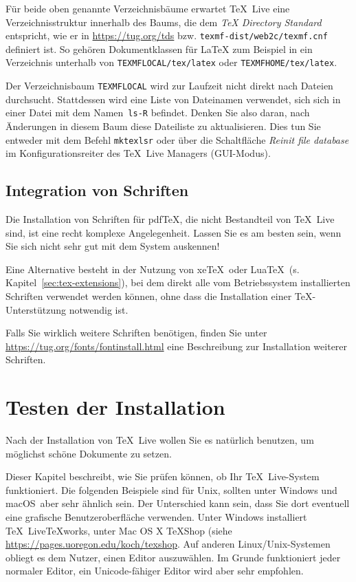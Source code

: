\documentclass[12pt,ngerman,a4paper,fullparskip]{scrreprt}
\newcommand{\TL}{\TeX\ Live\xspace}
\newcommand{\cmdname}[1]{\texttt{#1}}
\newcommand{\filename}[1]{\texttt{#1}}
\newcommand{\dirname}[1]{\texttt{#1}}
\providecommand*{\macOS}{macOS\xspace}
\providecommand*{\XeTeX}{xe\TeX\xspace}
\begin{document}
Für beide oben genannte Verzeichnisbäume erwartet \TL eine Verzeichnisstruktur innerhalb des Baums, die dem \emph{\TeX{} Directory Standard} entspricht, wie er in \url{https://tug.org/tds} bzw. \filename{texmf-dist/web2c/texmf.cnf} definiert ist.
So gehören Dokumentklassen für \LaTeX{} zum Beispiel in ein Verzeichnis
unterhalb von \dirname{TEXMFLOCAL/tex/latex} oder \dirname{TEXMFHOME/tex/latex}.

Der Verzeichnisbaum \dirname{TEXMFLOCAL} wird zur Laufzeit nicht direkt nach Dateien durchsucht. Stattdessen wird eine Liste von Dateinamen verwendet, sich sich in einer Datei mit dem Namen~\filename{ls-R} befindet. Denken Sie also daran, nach Änderungen in diesem Baum diese Dateiliste zu aktualisieren. Dies tun Sie
entweder mit dem Befehl \cmdname{mktexlsr} oder über die Schaltfläche \emph{Reinit file database} im Kon\-fi\-gu\-rations\-reiter des \TeX\ Live Managers (GUI-Modus).

\subsection{Integration von Schriften}

Die Installation von Schriften für pdf\TeX, die nicht Bestandteil von \TL sind, ist eine recht komplexe Angelegenheit. Lassen Sie es am besten sein, wenn Sie sich nicht sehr gut mit dem System auskennen! %

Eine Alternative besteht in der Nutzung von \XeTeX\ oder Lua\TeX\ (s.\,Kapitel~\ref{sec:tex-extensions}), bei dem direkt alle vom Betriebssystem installierten Schriften verwendet werden können, ohne dass die Installation einer \TeX-Unterstützung notwendig ist.

Falls Sie wirklich weitere Schriften benötigen, finden Sie unter \url{https://tug.org/fonts/fontinstall.html} eine Beschreibung zur
Installation weiterer Schriften.

\section{Testen der Installation}
\label{sec:test-install}


Nach der Installation von \TL wollen Sie es natürlich benutzen, um möglichst schöne Dokumente zu setzen.

Dieser Kapitel beschreibt, wie Sie prüfen können, ob Ihr \TL-System funktioniert.
Die folgenden Beispiele sind für Unix, sollten unter Windows und \macOS\ aber sehr ähnlich sein. Der Unterschied kann sein, dass Sie dort eventuell eine grafische Benutzeroberfläche verwenden. 
Unter Windows installiert \TL \TeX works, unter Mac OS X \TeX Shop (siehe \url{https://pages.uoregon.edu/koch/texshop}.  Auf anderen Linux/Unix-Systemen obliegt es dem Nutzer, einen Editor auszuwählen. 
Im Grunde funktioniert jeder normaler Editor, ein Unicode-fähiger Editor wird aber sehr empfohlen.
\end{document}
